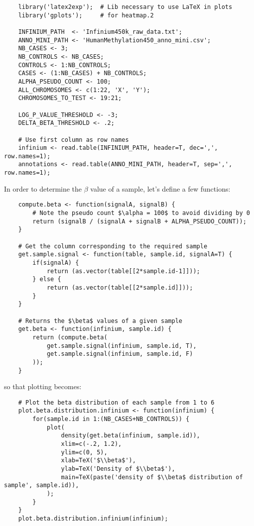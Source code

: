 \documentclass{article}
\begin{document}
\begin{lstlisting}
	library('latex2exp');  # Lib necessary to use LaTeX in plots
	library('gplots');     # for heatmap.2

	INFINIUM_PATH  <- 'Infinium450k_raw_data.txt';
	ANNO_MINI_PATH <- 'HumanMethylation450_anno_mini.csv';
	NB_CASES <- 3;
	NB_CONTROLS <- NB_CASES;
	CONTROLS <- 1:NB_CONTROLS;
	CASES <- (1:NB_CASES) + NB_CONTROLS;
	ALPHA_PSEUDO_COUNT <- 100;
	ALL_CHROMOSOMES <- c(1:22, 'X', 'Y');
	CHROMOSOMES_TO_TEST <- 19:21;

	LOG_P_VALUE_THRESHOLD <- -3;
	DELTA_BETA_THRESHOLD <- .2;

	# Use first column as row names
	infinium <- read.table(INFINIUM_PATH, header=T, dec=',', row.names=1);
	annotations <- read.table(ANNO_MINI_PATH, header=T, sep=',', row.names=1);
\end{lstlisting}

In order to determine the $\beta$ value of a sample, let's define a few functions:
\begin{lstlisting}
	compute.beta <- function(signalA, signalB) {
		# Note the pseudo count $\alpha = 100$ to avoid dividing by 0
		return (signalB / (signalA + signalB + ALPHA_PSEUDO_COUNT));
	}

	# Get the column corresponding to the required sample
	get.sample.signal <- function(table, sample.id, signalA=T) {
		if(signalA) {
			return (as.vector(table[[2*sample.id-1]]));
		} else {
			return (as.vector(table[[2*sample.id]]));
		}
	}

	# Returns the $\beta$ values of a given sample
	get.beta <- function(infinium, sample.id) {
		return (compute.beta(
			get.sample.signal(infinium, sample.id, T),
			get.sample.signal(infinium, sample.id, F)
		));
	}
\end{lstlisting}

so that plotting becomes:
\begin{lstlisting}
	# Plot the beta distribution of each sample from 1 to 6
	plot.beta.distribution.infinium <- function(infinium) {
		for(sample.id in 1:(NB_CASES+NB_CONTROLS)) {
			plot(
				density(get.beta(infinium, sample.id)),
				xlim=c(-.2, 1.2),
				ylim=c(0, 5),
				xlab=TeX('$\\beta$'),
				ylab=TeX('Density of $\\beta$'),
				main=TeX(paste('density of $\\beta$ distribution of sample', sample.id)),
			);
		}
	}
	plot.beta.distribution.infinium(infinium);
\end{lstlisting}
\end{document}
